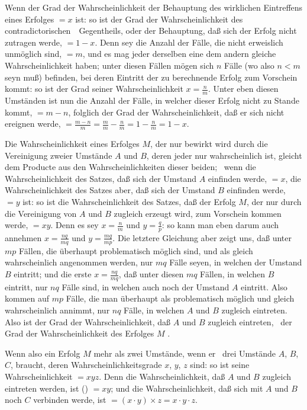 \begin{aufza}
\begin{aufzb}
\item Wenn der Grad der Wahrscheinlichkeit der Behauptung des wirklichen Eintreffens eines Erfolges $= x$ ist: so ist der Grad der Wahrscheinlichkeit des contradictorischen~\ Gegentheils, oder der Behauptung, daß sich der Erfolg nicht zutragen werde, $= 1 - x$. Denn sey die Anzahl der Fälle, die nicht erweislich unmöglich sind, $= m$, und es mag jeder derselben eine dem andern gleiche Wahrscheinlichkeit haben; unter diesen Fällen mögen sich $n$ Fälle (wo also $n < m$ seyn muß) befinden, bei deren Eintritt der zu berechnende Erfolg zum Vorschein kommt: so ist der Grad seiner Wahrscheinlichkeit $x = \frac{n}{m}$. Unter eben diesen Umständen ist nun die Anzahl der Fälle, in welcher dieser Erfolg nicht zu Stande kommt, $= m - n$, folglich der Grad der Wahrscheinlichkeit, daß er sich nicht ereignen werde, $= \frac{m - n}{m} = \frac{m}{m} - \frac{n}{m} = 1 - \frac{n}{m} = 1 - x$. 
\item Die Wahrscheinlichkeit eines Erfolges $M$, der nur bewirkt wird durch die Vereinigung zweier Umstände $A$ und $B$, deren jeder nur wahrscheinlich ist, gleicht dem Producte aus den Wahrscheinlichkeiten dieser beiden; \dh\ wenn die Wahrscheinlichkeit des Satzes, daß sich der Umstand $A$ einfinden werde, $= x$, die Wahrscheinlichkeit des Satzes aber, daß sich der Umstand $B$ einfinden werde, $= y$ ist: so ist die Wahrscheinlichkeit des Satzes, daß der Erfolg $M$, der nur durch die Vereinigung von $A$ und $B$ zugleich erzeugt wird, zum Vorschein kommen werde, $= xy$. Denn es sey $x = \frac{n}{m}$ und $y = \frac{q}{p}$: so kann man eben darum auch annehmen $x = \frac{nq}{mq}$ und $y = \frac{mq}{mp}$. Die letztere Gleichung aber zeigt uns, daß unter $mp$ Fällen, die überhaupt problematisch möglich sind, und als gleich wahrscheinlich angenommen werden, nur $mq$ Fälle seyen, in welchen der Umstand $B$ eintritt; und die erste $x = \frac{nq}{mq}$, daß unter diesen $mq$ Fällen, in welchen $B$ eintritt, nur $nq$ Fälle sind, in welchen auch noch der Umstand $A$ eintritt. Also kommen auf $mp$ Fälle, die man überhaupt als problematisch möglich und gleich wahrscheinlich annimmt, nur $nq$ Fälle, in welchen $A$ und $B$ zugleich eintreten. Also ist der Grad der Wahrscheinlichkeit, daß $A$ und $B$ zugleich eintreten, \dh\ der Grad der Wahrscheinlichkeit des Erfolges $M$ . 
\item Wenn also ein Erfolg $M$ mehr als zwei Umstände, wenn er \zB\ drei Umstände $A$, $B$, $C$, braucht, deren Wahrscheinlichkeitsgrade $x$, $y$, $z$ sind: so ist seine Wahrscheinlichkeit $= xyz$. Denn die Wahrscheinlichkeit, daß $A$ und $B$ zugleich eintreten werden, ist () $= xy$; und die Wahrscheinlichkeit, daß sich mit $A$ und $B$ noch $C$ verbinden werde, ist $= (x \cdot y) \times z = x \cdot y \cdot z$.

\end{aufzb}
\end{aufza}
